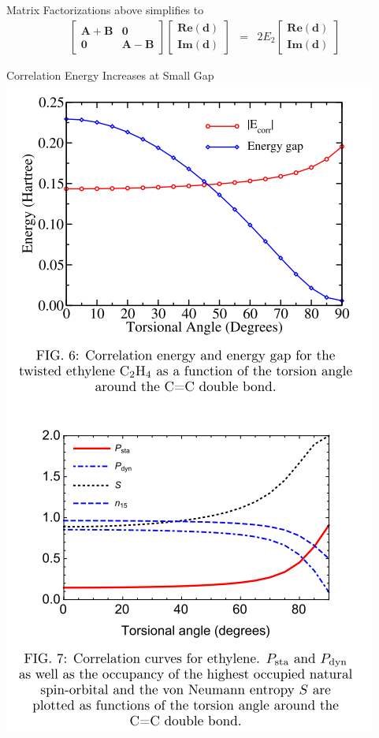 \documentclass[10pt]{beamer}
\begin{document}
{{{{{{{{{{{{{{{{{\begin{frame}{Matrix Factorizations}
  above simplifies to 
  \begin{eqnarray*}
    \begin{bmatrix}
      \mathbf{A + B} & \mathbf{0} \\
      \mathbf{0} & \mathbf{A - B} 
    \end{bmatrix}
    \begin{bmatrix}
      \mathbf{Re(d)} \\
      \mathbf{Im(d)} 
    \end{bmatrix}
    &=& 2E_2   
    \begin{bmatrix}
      \mathbf{Re(d)} \\
      \mathbf{Im(d)} 
    \end{bmatrix}
  \end{eqnarray*}
\end{frame}


\begin{frame}{Correlation Energy Increases at Small Gap}
  \centering
	\includegraphics[width=.4\linewidth]{../figures/gap_vs_corr_Marques.png}
\end{frame}

}}}}}}}}}}}}}}}}}
\end{document}
